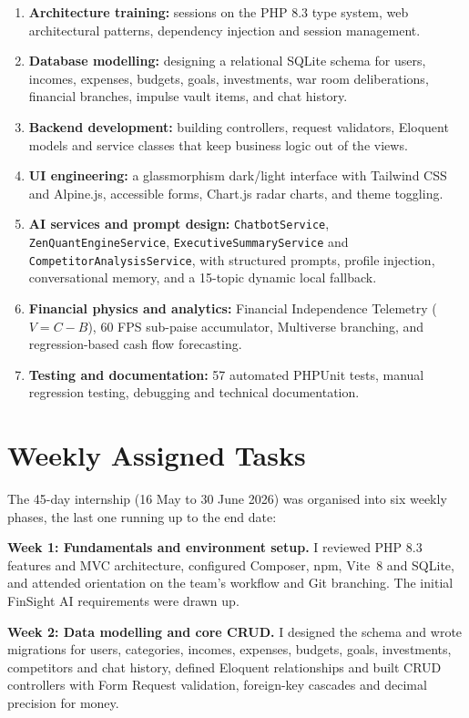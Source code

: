 \documentclass[12pt,a4paper]{report}
\newcommand{\VITE}{Vite~8}
\begin{document}
\begin{enumerate}[leftmargin=*]
    \item \textbf{Architecture training:} sessions on the PHP 8.3 type system, web architectural patterns, dependency injection and session management.
    \item \textbf{Database modelling:} designing a relational SQLite schema for users, incomes, expenses, budgets, goals, investments, war room deliberations, financial branches, impulse vault items, and chat history.
    \item \textbf{Backend development:} building controllers, request validators, Eloquent models and service classes that keep business logic out of the views.
    \item \textbf{UI engineering:} a glassmorphism dark/light interface with Tailwind CSS and Alpine.js, accessible forms, Chart.js radar charts, and theme toggling.
    \item \textbf{AI services and prompt design:} \texttt{ChatbotService}, \texttt{ZenQuantEngineService}, \texttt{ExecutiveSummaryService} and \texttt{CompetitorAnalysisService}, with structured prompts, profile injection, conversational memory, and a 15-topic dynamic local fallback.
    \item \textbf{Financial physics and analytics:} Financial Independence Telemetry ($V = C - B$), 60 FPS sub-paise accumulator, Multiverse branching, and regression-based cash flow forecasting.
    \item \textbf{Testing and documentation:} 57 automated PHPUnit tests, manual regression testing, debugging and technical documentation.
\end{enumerate}


\section{Weekly Assigned Tasks}\label{s35}

The 45-day internship (16 May to 30 June 2026) was organised into six weekly phases, the last one running up to the end date:

\textbf{Week 1: Fundamentals and environment setup.}
I reviewed PHP 8.3 features and MVC architecture, configured Composer, npm, \VITE{} and SQLite, and attended orientation on the team's workflow and Git branching. The initial FinSight AI requirements were drawn up.

\textbf{Week 2: Data modelling and core CRUD.}
I designed the schema and wrote migrations for users, categories, incomes, expenses, budgets, goals, investments, competitors and chat history, defined Eloquent relationships and built CRUD controllers with Form Request validation, foreign-key cascades and decimal precision for money.
\end{document}
